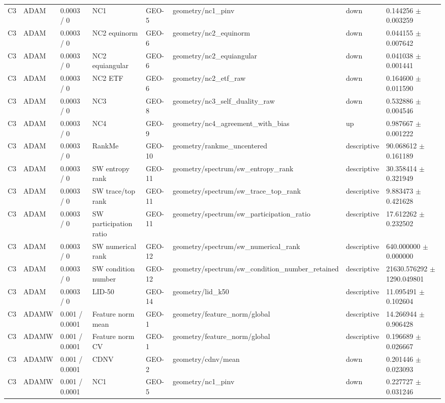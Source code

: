 \begin{longtable}{llllllll}
C3 & ADAM & 0.0003 / 0 & NC1 & GEO-5 & geometry/nc1\_pinv & down & 0.144256 $\pm$ 0.003259 \\
C3 & ADAM & 0.0003 / 0 & NC2 equinorm & GEO-6 & geometry/nc2\_equinorm & down & 0.044155 $\pm$ 0.007642 \\
C3 & ADAM & 0.0003 / 0 & NC2 equiangular & GEO-6 & geometry/nc2\_equiangular & down & 0.041038 $\pm$ 0.001441 \\
C3 & ADAM & 0.0003 / 0 & NC2 ETF & GEO-6 & geometry/nc2\_etf\_raw & down & 0.164600 $\pm$ 0.011590 \\
C3 & ADAM & 0.0003 / 0 & NC3 & GEO-8 & geometry/nc3\_self\_duality\_raw & down & 0.532886 $\pm$ 0.004546 \\
C3 & ADAM & 0.0003 / 0 & NC4 & GEO-9 & geometry/nc4\_agreement\_with\_bias & up & 0.987667 $\pm$ 0.001222 \\
C3 & ADAM & 0.0003 / 0 & RankMe & GEO-10 & geometry/rankme\_uncentered & descriptive & 90.068612 $\pm$ 0.161189 \\
C3 & ADAM & 0.0003 / 0 & SW entropy rank & GEO-11 & geometry/spectrum/sw\_entropy\_rank & descriptive & 30.358414 $\pm$ 0.321949 \\
C3 & ADAM & 0.0003 / 0 & SW trace/top rank & GEO-11 & geometry/spectrum/sw\_trace\_top\_rank & descriptive & 9.883473 $\pm$ 0.421628 \\
C3 & ADAM & 0.0003 / 0 & SW participation ratio & GEO-11 & geometry/spectrum/sw\_participation\_ratio & descriptive & 17.612262 $\pm$ 0.232502 \\
C3 & ADAM & 0.0003 / 0 & SW numerical rank & GEO-12 & geometry/spectrum/sw\_numerical\_rank & descriptive & 640.000000 $\pm$ 0.000000 \\
C3 & ADAM & 0.0003 / 0 & SW condition number & GEO-12 & geometry/spectrum/sw\_condition\_number\_retained & descriptive & 21630.576292 $\pm$ 1290.049801 \\
C3 & ADAM & 0.0003 / 0 & LID-50 & GEO-14 & geometry/lid\_k50 & descriptive & 11.095491 $\pm$ 0.102604 \\
C3 & ADAMW & 0.001 / 0.0001 & Feature norm mean & GEO-1 & geometry/feature\_norm/global & descriptive & 14.266944 $\pm$ 0.906428 \\
C3 & ADAMW & 0.001 / 0.0001 & Feature norm CV & GEO-1 & geometry/feature\_norm/global & descriptive & 0.196689 $\pm$ 0.026667 \\
C3 & ADAMW & 0.001 / 0.0001 & CDNV & GEO-2 & geometry/cdnv/mean & down & 0.201446 $\pm$ 0.023093 \\
C3 & ADAMW & 0.001 / 0.0001 & NC1 & GEO-5 & geometry/nc1\_pinv & down & 0.227727 $\pm$ 0.031246 \\

\end{longtable}
